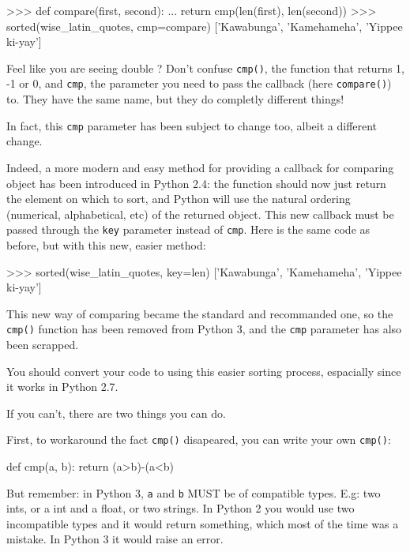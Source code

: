 \begin{py2}
>>> def compare(first, second):
...     return cmp(len(first), len(second))
>>> sorted(wise_latin_quotes, cmp=compare)
['Kawabunga', 'Kamehameha', 'Yippee ki-yay']
\end{py2}

Feel like you are seeing double ? Don't confuse \lstinline{cmp()}, the function that returns 1, -1 or 0, and \lstinline{cmp}, the parameter you need to pass the callback (here \lstinline{compare()}) to. They have the same name, but they do completly different things!

In fact, this \lstinline{cmp} parameter has been subject to change too, albeit a different change.

Indeed, a more modern and easy method for providing a callback for comparing object has been introduced in Python 2.4: the function should now just return the element on which to sort, and Python will use the natural ordering (numerical, alphabetical, etc) of the returned object. This new callback must be passed through the \lstinline{key} parameter instead of \lstinline{cmp}. Here is the same code as before, but with this new, easier method:

\begin{py2and3}
>>> sorted(wise_latin_quotes, key=len)
['Kawabunga', 'Kamehameha', 'Yippee ki-yay']
\end{py2and3}

This new way of comparing became the standard and recommanded one, so the \lstinline{cmp()} function has been removed from Python 3, and the \lstinline{cmp} parameter has also been scrapped.

You should convert your code to using this easier sorting process, espacially since it works in Python 2.7.

If you can't, there are two things you can do.

First, to workaround the fact \lstinline{cmp()} disapeared, you can write your own \lstinline{cmp()}:

\begin{py2and3}
def cmp(a, b):
    return (a>b)-(a<b)
\end{py2and3}

But remember: in Python 3, \lstinline{a} and \lstinline{b} MUST be of compatible types. E.g: two ints, or a int and a float, or two strings. In Python 2 you would use two incompatible types and it would return something, which most of the time was a mistake. In Python 3 it would raise an error.

